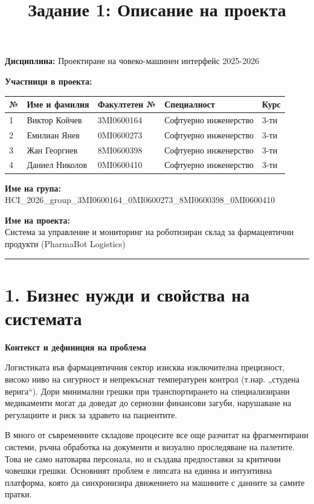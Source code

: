 \documentclass[12pt, a4paper]{article}
\title{Задание 1: Описание на проекта}
\author{}
\date{}
\begin{document}
\maketitle

\noindent\textbf{Дисциплина:} Проектиране на човеко-машинен интерфейс 2025-2026

\bigskip

\noindent\textbf{Участници в проекта:}
\smallskip

\noindent
\begin{tabularx}{\textwidth}{|l|X|l|X|l|}
\hline
\textbf{№} & \textbf{Име и фамилия} & \textbf{Факултетен №} & \textbf{Специалност} & \textbf{Курс} \\ \hline
1 & Виктор Койчев & 3MI0600164 & Софтуерно инженерство & 3-ти \\ \hline
2 & Емилиан Янев & 0MI0600273 & Софтуерно инженерство & 3-ти \\ \hline
3 & Жан Георгиев & 8MI0600398 & Софтуерно инженерство & 3-ти \\ \hline
4 & Даниел Николов & 0MI0600410 & Софтуерно инженерство & 3-ти \\ \hline
\end{tabularx}

\bigskip

\noindent\textbf{Име на група:}\\
HCI\_2026\_group\_3MI0600164\_0MI0600273\_8MI0600398\_0MI0600410

\bigskip

\noindent\textbf{Име на проекта:}\\
Система за управление и мониторинг на роботизиран склад за фармацевтични продукти (PharmaBot Logistics)

\bigskip
\rule{\textwidth}{0.4pt}

\section*{1. Бизнес нужди и свойства на системата}

\textbf{Контекст и дефиниция на проблема}

Логистиката във фармацевтичния сектор изисква изключителна прецизност, високо ниво на сигурност и непрекъснат температурен контрол (т.нар. „студена верига“). Дори минимални грешки при транспортирането на специализирани медикаменти могат да доведат до сериозни финансови загуби, нарушаване на регулациите и риск за здравето на пациентите. 

В много от съвременните складове процесите все още разчитат на фрагментирани системи, ръчна обработка на документи и визуално проследяване на палетите. Това не само натоварва персонала, но и създава предпоставки за критични човешки грешки. Основният проблем е липсата на единна и интуитивна платформа, която да синхронизира движението на машините с данните за самите пратки.
\end{document}
